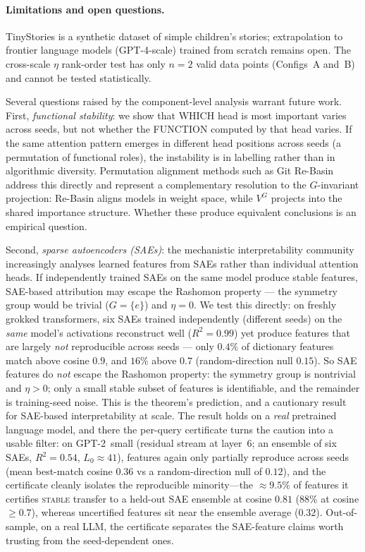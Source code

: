 \documentclass[11pt,a4paper]{article}
\begin{document}
\paragraph{Limitations and open questions.}
TinyStories is a synthetic dataset of simple children's stories; extrapolation to frontier language models (GPT-4-scale) trained from scratch remains open.  The cross-scale $\eta$ rank-order test has only $n = 2$ valid data points (Configs~A and~B) and cannot be tested statistically.

Several questions raised by the component-level analysis warrant future work.  First, \emph{functional stability}: we show that WHICH head is most important varies across seeds, but not whether the FUNCTION computed by that head varies.  If the same attention pattern emerges in different head positions across seeds (a permutation of functional roles), the instability is in labelling rather than in algorithmic diversity.  Permutation alignment methods such as Git Re-Basin~\cite{ainsworth2023git} address this directly and represent a complementary resolution to the $G$-invariant projection: Re-Basin aligns models in weight space, while $V^G$ projects into the shared importance structure.  Whether these produce equivalent conclusions is an empirical question.

Second, \emph{sparse autoencoders (SAEs)}: the mechanistic interpretability community increasingly analyses learned features from SAEs rather than individual attention heads.  If independently trained SAEs on the same model produce stable features, SAE-based attribution may escape the Rashomon property --- the symmetry group would be trivial ($G = \{e\}$) and $\eta = 0$.  We test this directly: on freshly grokked transformers, six SAEs trained independently (different seeds) on the \emph{same} model's activations reconstruct well ($R^2 = 0.99$) yet produce features that are largely \emph{not} reproducible across seeds --- only $0.4\%$ of dictionary features match above cosine $0.9$, and $16\%$ above $0.7$ (random-direction null $0.15$).  So SAE features do \emph{not} escape the Rashomon property: the symmetry group is nontrivial and $\eta > 0$; only a small stable subset of features is identifiable, and the remainder is training-seed noise.  This is the theorem's prediction, and a cautionary result for SAE-based interpretability at scale.  The result holds on a \emph{real} pretrained language model, and there the per-query certificate turns the caution into a usable filter: on GPT-2~small (residual stream at layer~6; an ensemble of six SAEs, $R^2 = 0.54$, $L_0 \approx 41$), features again only partially reproduce across seeds (mean best-match cosine $0.36$ vs a random-direction null of $0.12$), and the certificate cleanly isolates the reproducible minority---the $\approx 9.5\%$ of features it certifies \textsc{stable} transfer to a held-out SAE ensemble at cosine $0.81$ ($88\%$ at cosine $\geq 0.7$), whereas uncertified features sit near the ensemble average ($0.32$).  Out-of-sample, on a real LLM, the certificate separates the SAE-feature claims worth trusting from the seed-dependent ones.
\end{document}
